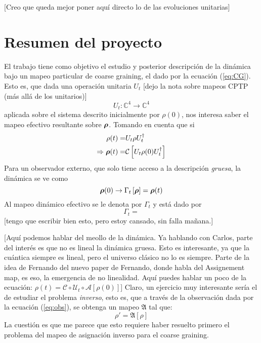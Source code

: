 \documentclass[onecolumn,11pt]{article}
\newcommand{\mcU}{\mathcal{U}}
\newcommand{\mcC}{\mathcal{C}}
\newcommand{\mcA}{\mathcal{A}}
\newcommand{\Cc}{\mathcal{C}} %
\newcommand{\Hh}{\mathbb{C}} %
\newcommand{\CG}[1]{\Cc\left[#1\right]}
\newcommand*{\B}[1]{\ifmmode\bm{#1}\else\textbf{#1}\fi}
\newcommand{\nota}[1]{{\color{red} [#1]}}
\newcommand{\notaAd}[1]{{\color{blue} [#1]}} %
\begin{document}
\notaAd{Creo que queda mejor poner aquí directo lo de las evoluciones unitarias}
\vspace{0.5cm}
\section{Resumen del proyecto}

El trabajo tiene como objetivo el estudio y posterior descripción de la dinámica bajo un mapeo particular de coarse graining, el dado por la ecuación (\ref{eq:CG}). Esto es, que dada una operación unitaria $U_{t}$ \notaAd{dejo la nota sobre mapeos CPTP (más allá de los unitarios)}
\begin{equation}
    U_{t}:\Hh^{4}\rightarrow\Hh^{4}
\end{equation}
aplicada sobre el sistema descrito inicialmente por $\rho(0)$, nos interesa saber el mapeo efectivo resultante sobre $\B{\rho}$. Tomando en cuenta que si
\begin{align}
    \rho(t)=&U_{t}\rho U_{t}^{\dag}\\
    \Rightarrow \B{\rho}(t)=&\CG{U_{t}\rho(0) U_{t}^{\dag}}
\end{align}
Para un observador externo, que solo tiene acceso a la descripción \textit{gruesa}, la dinámica se ve como
\begin{equation}\label{eq:obs}
    \B{\rho}(0)\rightarrow\Gamma_{t}\left[\B{\rho}\right]=\B{\rho}(t)
\end{equation}
Al mapeo dinámico efectivo se le denota por $\Gamma_{t}$ y está dado por
\begin{equation}
    \Gamma_{t}=
\end{equation}
\notaAd{tengo que escribir bien esto, pero estoy cansado, sin falla mañana.}


\nota{Aquí podemos hablar del meollo de la dinámica. Ya hablando con Carlos, parte del interés es que no es lineal la dinámica gruesa. Esto es interesante, ya que la cuántica siempre es lineal, pero el universo clásico no lo es siempre. Parte de la idea de Fernando del nuevo paper de Fernando, donde habla del Assignement map, es eso, la emergencia de no linealidad. Aquí puedes hablar un poco de la ecuación: $\rho(t)=\mcC \circ \mcU_t \circ \mcA [\rho(0)]$} Claro, un ejercicio muy interesante sería el de estudiar el problema \textit{inverso}, esto es, que a través de la observación dada por la ecuación (\ref{eq:obs}), se obtenga un mapeo $\mathfrak{A}$ tal que:
\begin{equation}
    \rho'=\mathfrak{A}\left[\rho\right]
\end{equation}
La cuestión es que me parece que esto requiere haber resuelto primero el problema del mapeo de asignación inverso para el coarse graining.
\end{document}
